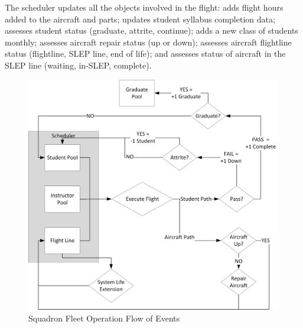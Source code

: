 \documentclass[preprint,12pt]{elsarticle}
\begin{document}
The scheduler updates all the objects involved in the flight: adds
flight hours added to the aircraft and parts; updates student syllabus
completion data; assesses student status (graduate, attrite,
continue); adds a new class of students monthly; assesses aircraft
repair status (up or down); assesses aircraft flightline status
(flightline, SLEP line, end of life); and assesses status of aircraft in
the SLEP line (waiting, in-SLEP, complete). 











\begin{figure}[h]
  \centering\includegraphics[width=5in]{DESflow.png}
  \caption{Squadron Fleet Operation Flow of Events}
% 
% 
  \label{f:DESflow}
\end{figure}
\end{document}
